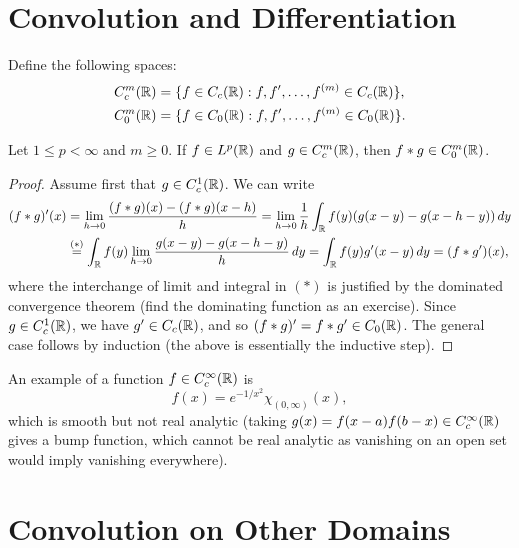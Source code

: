 \section{Convolution and Differentiation}

\begin{definition}
  Define the following spaces:
  \begin{align*}
    C_c^m(\mathbb{R}) &= \{f \in C_c(\mathbb{R}) : f, f', \dots, f^{(m)} \in C_c(\mathbb{R})\}, \\
    C_0^m(\mathbb{R}) &= \{f \in C_0(\mathbb{R}) : f, f', \dots, f^{(m)} \in C_0(\mathbb{R})\}.
  \end{align*}
\end{definition}

\begin{prop}
  Let $1 \le p < \infty$ and $m \ge 0$. If
  $f \in L^p(\mathbb{R})$ and $g \in C^m_c(\mathbb{R})$, then
  $f * g \in C_0^m(\mathbb{R})$.
\end{prop}

\begin{proof}
  Assume first that $g \in C^1_c(\mathbb{R})$. We can write
  \begin{align*}
    (f * g)'(x)
    &= \lim_{h \to 0} \frac{(f * g)(x) - (f * g)(x - h)}{h}
    = \lim_{h \to 0} \frac{1}{h} \int_{\mathbb{R}} f(y)(g(x - y) - g(x - h - y))\, dy \\
    &\overset{(*)}{=} \int_{\mathbb{R}} f(y) \lim_{h \to 0} \frac{g(x - y) - g(x - h - y)}{h}\, dy
    = \int_{\mathbb{R}} f(y) g'(x - y)\, dy
    = (f * g')(x),
  \end{align*}
  where the interchange of limit and integral in
  $(*)$ is justified by the dominated convergence theorem
  (find the dominating function as an exercise).
  Since $g \in C_c^1(\mathbb{R})$, we have $g' \in C_c(\mathbb{R})$,
  and so $(f * g)' = f * g' \in C_0(\mathbb{R})$.
  The general case follows by induction (the above
  is essentially the inductive step).
\end{proof}

\begin{example}
  An example of a function
  $f \in C_c^\infty(\mathbb{R})$ is
  \[
    f(x) = e^{-1 / x^2} \chi_{(0, \infty)}(x),
  \]
  which is smooth but not real analytic (taking
  $g(x) = f(x - a) f(b - x) \in C_c^\infty(\mathbb{R})$ gives
  a bump function, which cannot be real analytic
  as vanishing on an open set would imply vanishing
  everywhere).
\end{example}

\section{Convolution on Other Domains}

